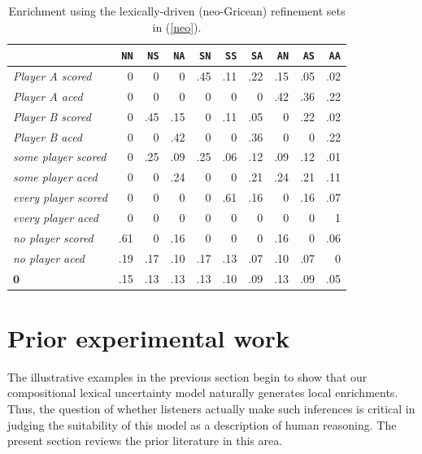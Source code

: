 \documentclass[leqno,12pt]{article}
\newcommand{\eg}[1]{(\ref{#1})}
\newcommand{\word}[1]{\emph{#1}}
\newcommand{\graycell}[1]{{\cellcolor[gray]{.8}#1}}
\newcommand{\nullmsg}{\mathbf{0}}
\newcommand{\world}[1]{\texttt{#1}}
\begin{document}
{\begin{table}[t]
  \centering
  \renewcommand{\arraystretch}{0.98}
  \setlength{\tabcolsep}{8pt}
  \begin{tabular}[c]{l *{9}{r} }
  \toprule
    & \world{NN} & \world{NS} & \world{NA} & \world{SN} & \world{SS} & \world{SA} & \world{AN} & \world{AS} & \world{AA}\\
    \midrule
    \word{Player A scored}     & 0 & 0 & 0 & \graycell{.45} & .11 & .22 & .15 & .05 & .02\\
    \word{Player A aced}       & 0 & 0 & 0 & 0 & 0 & 0 & \graycell{.42} & .36 & .22\\
    \word{Player B scored}     & 0 & \graycell{.45} & .15 & 0 & .11 & .05 & 0 & .22 & .02\\
    \word{Player B aced}       & 0 & 0 & \graycell{.42} & 0 & 0 & .36 & 0 & 0 & .22\\
    \word{some player scored}  & 0 & \graycell{.25} & .09 & \graycell{.25} & .06 & .12 & .09 & .12 & .01\\
    \word{some player aced}    & 0 & 0 & \graycell{.24} & 0 & 0 & .21 & \graycell{.24} & .21 & .11\\
    \word{every player scored} & 0 & 0 & 0 & 0 & \graycell{.61} & .16 & 0 & .16 & .07\\
    \word{every player aced}   & 0 & 0 & 0 & 0 & 0 & 0 & 0 & 0 & \graycell{1}\\
    \word{no player scored}    & \graycell{.61} & 0 & .16 & 0 & 0 & 0 & .16 & 0 & .06\\
    \word{no player aced}      & \graycell{.19} & .17 & .10 & .17 & .13 & .07 & .10 & .07 & 0\\
    $\nullmsg$                 & \graycell{.15} & .13 & .13 & .13 & .10 & .09 & .13 & .09 & .05\\
    \bottomrule
  \end{tabular}
  \caption{Enrichment using the lexically-driven (neo-Gricean) refinement sets in \eg{neo}.}
  \label{tab:subjects-ALTstyle}
\end{table}



\section{Prior experimental work}\label{sec:lit}

The illustrative examples in the previous section begin to show that
our compositional lexical uncertainty model naturally generates local
enrichments. Thus, the question of whether listeners actually make
such inferences is critical in judging the suitability of this model
as a description of human reasoning.  The present section reviews the
prior literature in this area.

}
\end{document}
